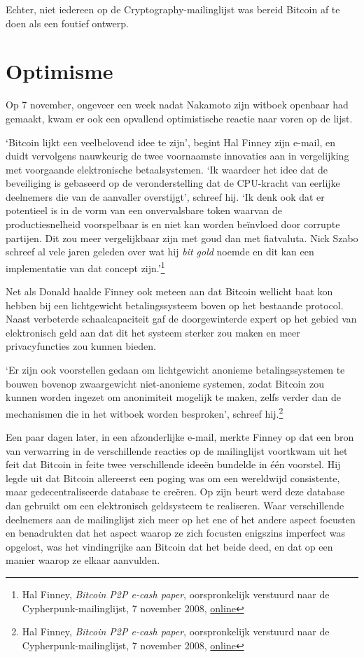 \documentclass[
  a5paper,
  smalldemyvopaper,11pt,twoside,onecolumn,openright,extrafontsizes,
hidelinks]{memoir}
\begin{document}
Echter, niet iedereen op de Cryptography-mailinglijst was bereid Bitcoin
af te doen als een foutief ontwerp.

\section{Optimisme}\label{optimisme}

Op 7 november, ongeveer een week nadat Nakamoto zijn witboek openbaar
had gemaakt, kwam er ook een opvallend optimistische reactie naar voren
op de lijst.

`Bitcoin lijkt een veelbelovend idee te zijn', begint Hal Finney zijn
e-mail, en duidt vervolgens nauwkeurig de twee voornaamste innovaties
aan in vergelijking met voorgaande elektronische betaalsystemen. `Ik
waardeer het idee dat de beveiliging is gebaseerd op de veronderstelling
dat de CPU-kracht van eerlijke deelnemers die van de aanvaller
overstijgt', schreef hij. `Ik denk ook dat er potentieel is in de vorm
van een onvervalsbare token waarvan de productiesnelheid voorspelbaar is
en niet kan worden beïnvloed door corrupte partijen. Dit zou meer
vergelijkbaar zijn met goud dan met fiatvaluta. Nick Szabo schreef al
vele jaren geleden over wat hij \emph{bit gold} noemde en dit kan een
implementatie van dat concept zijn.'\footnote{Hal Finney, \emph{Bitcoin
  P2P e-cash paper}, oorspronkelijk verstuurd naar de
  Cypherpunk-mailinglijst, 7 november 2008,
  \href{https://www.metzdowd.com/pipermail/cryptography/2008-November/014827.html}{online}}

Net als Donald haalde Finney ook meteen aan dat Bitcoin wellicht baat
kon hebben bij een lichtgewicht betalingssysteem boven op het bestaande
protocol. Naast verbeterde schaalcapaciteit gaf de doorgewinterde expert
op het gebied van elektronisch geld aan dat dit het systeem sterker zou
maken en meer privacyfuncties zou kunnen bieden.

`Er zijn ook voorstellen gedaan om lichtgewicht anonieme
betalingssystemen te bouwen bovenop zwaargewicht niet-anonieme systemen,
zodat Bitcoin zou kunnen worden ingezet om anonimiteit mogelijk te
maken, zelfs verder dan de mechanismen die in het witboek worden
besproken', schreef hij.\footnote{Hal Finney, \emph{Bitcoin P2P e-cash
  paper}, oorspronkelijk verstuurd naar de Cypherpunk-mailinglijst, 7
  november 2008,
  \href{https://www.metzdowd.com/pipermail/cryptography/2008-November/014827.html}{online}}

Een paar dagen later, in een afzonderlijke e-mail, merkte Finney op dat
een bron van verwarring in de verschillende reacties op de mailinglijst
voortkwam uit het feit dat Bitcoin in feite twee verschillende ideeën
bundelde in één voorstel. Hij legde uit dat Bitcoin allereerst een
poging was om een wereldwijd consistente, maar gedecentraliseerde
database te creëren. Op zijn beurt werd deze database dan gebruikt om
een elektronisch geldsysteem te realiseren. Waar verschillende
deelnemers aan de mailinglijst zich meer op het ene of het andere aspect
focusten en benadrukten dat het aspect waarop ze zich focusten enigszins
imperfect was opgelost, was het vindingrijke aan Bitcoin dat het beide
deed, en dat op een manier waarop ze elkaar aanvulden.
\end{document}
